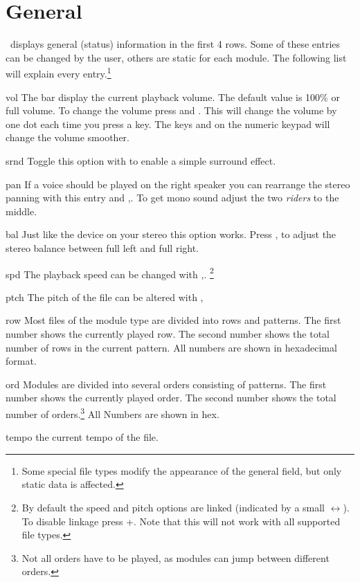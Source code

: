\section{General}
\label{playerGeneral}
\cp\ displays general (status) information in the first 4 rows. Some of these
entries can be changed by the user, others are static for each module. The
following list will explain every entry.\footnote{Some special file types modify the
appearance of the general field, but only static data is affected.}
\begin{dojlist}
\item[vol] The bar display the current playback volume. The default value is
100\% or full volume. To change the volume press  and . This
will change the volume by one dot each time you press a key. The keys \keys{+}
and \keys{-} on the numeric keypad will change the volume smoother.
\item[srnd] Toggle this option with  to enable a simple surround
effect.
\item[pan] If a voice should be played on the right speaker you can rearrange
the stereo panning with this entry and ,. To get mono sound
adjust the two \emph{riders} to the middle.
\item[bal] Just like the device on your stereo this option works. Press
, to adjust the stereo balance between full left and full
right.
\item[spd] The playback speed can be changed with ,.
\footnote{By default the speed and pitch options are linked (indicated by a
small $\leftrightarrow$). To disable linkage press +.
Note that this will not work with all supported file types.}
\item[ptch] The pitch of the file can be altered with ,
\item[row] Most files of the module type are divided into rows and patterns.
The first number shows the currently played row. The second number shows the
total number of rows in the current pattern. All numbers are shown in hexadecimal
format.
\item[ord] Modules are divided into several orders consisting of patterns. The
first number shows the currently played order. The second number shows the
total number of orders.\footnote{Not all orders have to be played, as modules
can jump between different orders.} All Numbers are shown in hex.
\item[tempo] the current tempo of the file.

\end{dojlist}
